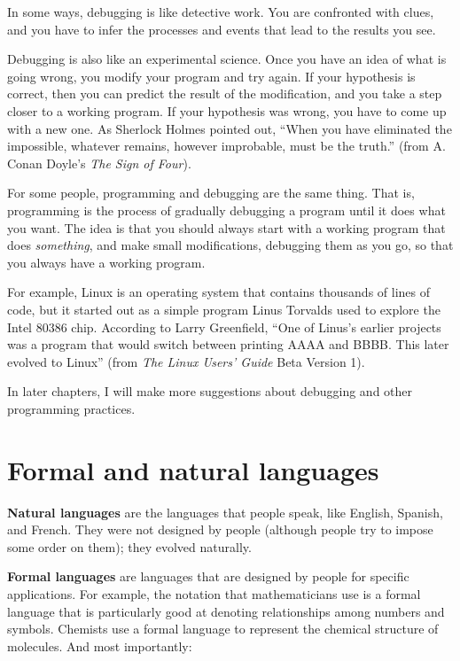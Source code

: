 In some ways, debugging is like detective work.  You are
confronted with clues, and you have to infer the processes
and events that lead to the results you see.

Debugging is also like an experimental science.  Once you have an idea of what is going wrong, you modify your program and try again.  If your
hypothesis is correct, then you can predict the result of the
modification, and you take a step closer to a working program.  If
your hypothesis was wrong, you have to come up with a new one.  As
Sherlock Holmes pointed out, ``When you have eliminated the
impossible, whatever remains, however improbable, must be the truth.''
(from A. Conan Doyle's {\em The Sign of Four}).


For some people, programming and debugging are the
same thing.  That is, programming is the process of gradually
debugging a program until it does what you want.  The idea
is that you should always start with a working program that
does {\em something}, and make small modifications, debugging
them as you go, so that you always have a working program.

For example, Linux is an operating system that contains thousands of
lines of code, but it started out as a simple program Linus Torvalds
used to explore the Intel 80386 chip.  According to Larry Greenfield,
``One of Linus's earlier projects was a program that would switch
between printing AAAA and BBBB.  This later evolved to Linux''
(from {\em The Linux Users' Guide} Beta Version 1).


In later chapters, I will make more suggestions about debugging
and other programming practices.

\section{Formal and natural languages}
\label{formal}

{\bf Natural languages} are the languages that people speak,
like English, Spanish, and French.  They were not designed
by people (although people try to impose some order on them);
they evolved naturally.

{\bf Formal languages} are languages that are designed by people for
specific applications.  For example, the notation that mathematicians
use is a formal language that is particularly good at denoting
relationships among numbers and symbols.  Chemists use a formal
language to represent the chemical structure of molecules.  And
most importantly:

